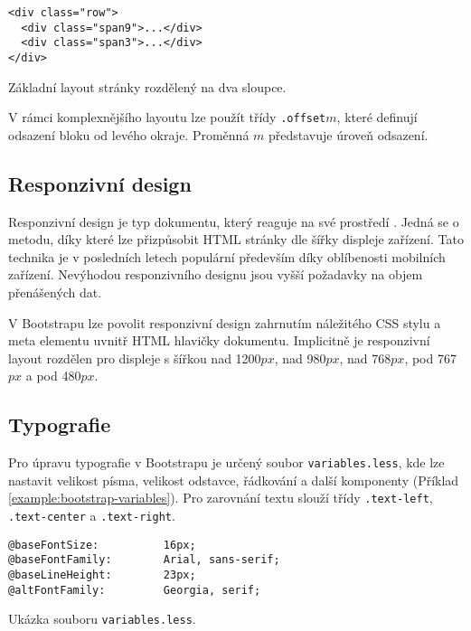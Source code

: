 \begin{example}
    \centering
    \begin{lstlisting}
<div class="row">
  <div class="span9">...</div>
  <div class="span3">...</div>
</div>
    \end{lstlisting}
    \caption{Základní layout stránky rozdělený na dva sloupce.}
    \label{example:basic-layout}
\end{example}

V rámci komplexnějšího layoutu lze použít třídy \texttt{.offset}$m$, které definují odsazení bloku od levého okraje. Proměnná $m$ představuje úroveň odsazení.

\subsection{Responzivní design}

Responzivní design je typ dokumentu, který reaguje na své prostředí \cite{responsive-design}. Jedná se o metodu, díky které lze přizpůsobit HTML stránky dle šířky displeje zařízení. Tato technika je v posledních letech populární především díky oblíbenosti mobilních zařízení. Nevýhodou responzivního designu jsou vyšší požadavky na objem přenášených dat.

V Bootstrapu lze povolit responzivní design zahrnutím náležitého CSS stylu a meta elementu uvnitř HTML hlavičky dokumentu. Implicitně je responzivní layout rozdělen pro displeje s šířkou nad 1200$px$, nad 980$px$, nad 768$px$, pod 767$px$ a pod 480$px$.

\subsection{Typografie}

Pro úpravu typografie v Bootstrapu je určený soubor \texttt{variables.less}, kde lze nastavit velikost písma, velikost odstavce, řádkování a další komponenty (Příklad \ref{example:bootstrap-variables}). Pro zarovnání textu slouží třídy \texttt{.text-left}, \texttt{.text-center} a \texttt{.text-right}.

\begin{example}
    \centering
    \begin{lstlisting}
@baseFontSize:          16px;
@baseFontFamily:        Arial, sans-serif;
@baseLineHeight:        23px;
@altFontFamily:         Georgia, serif;
    \end{lstlisting}
    \caption{Ukázka souboru \texttt{variables.less}.}
    \label{example:bootstrap-variables}
\end{example}

